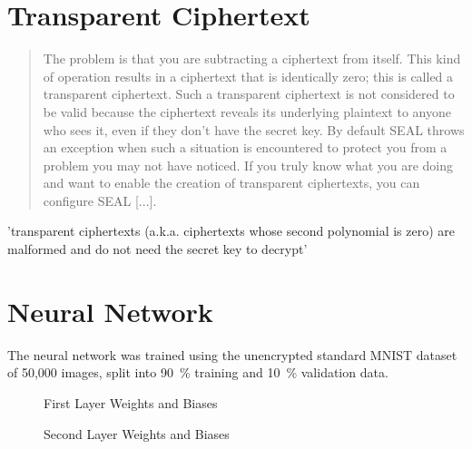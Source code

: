 \section{Transparent Ciphertext}
\begin{quote}
  The problem is that you are subtracting a ciphertext from itself.
  This kind of operation results in a ciphertext that is identically zero; this is called a transparent ciphertext. Such a transparent ciphertext is not considered to be valid because the ciphertext reveals its underlying plaintext to anyone who sees it, even if they don't have the secret key.
  By default SEAL throws an exception when such a situation is encountered to protect you from a problem you may not have noticed.
  If you truly know what you are doing and want to enable the creation of transparent ciphertexts, you can configure SEAL [...].
  \parencite{kim-laine-on-transparent-ciphertexts}
\end{quote}

'transparent ciphertexts (a.k.a. ciphertexts whose second polynomial is zero) are malformed and do not need the secret key to decrypt'

\section{Neural Network}
The neural network was trained using the unencrypted standard MNIST dataset of 50,000 images,
split into \SI{90}{\percent} training and \SI{10}{\percent} validation data.

\begin{figure}[H]
  \centering
  \caption{First Layer Weights and Biases}
\end{figure}

\begin{figure}[H]
  \centering
  \pgfplotsset{/pgfplots/group/.cd,vertical sep=2.0cm}
  \caption{Second Layer Weights and Biases}
\end{figure}
